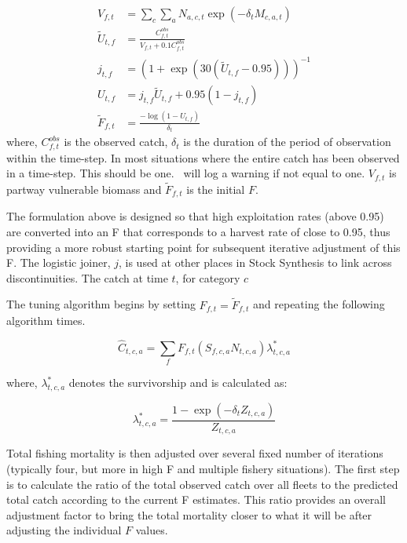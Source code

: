 \begin{align}
	V_{f,t} &= \sum\limits_c\sum\limits_a N_{a,c,t} \exp\left(-\delta_t M_{c,a,t}\right) \nonumber \\
	\tilde{U}_{t,f} &= \frac{C^{obs}_{f,t}}{V_{f,t} + 0.1 C^{obs}_{f,t}}\\
	j_{t,f} &= \left(1 + \exp \left(30 (\tilde{U}_{t,f} - 0.95) \right)\right)^{-1}\\
	U_{t,f} &= 	j_{t,f} \tilde{U}_{t,f} + 0.95 (1 - j_{t,f} )\\
	\tilde{F}_{f,t} &= \frac{-\log\left(1 - U_{t,f}\right)}{\delta_t}
\end{align}
where, \(C^{obs}_{f,t}\) is the observed catch, \(\delta_t\) is the duration of the period of observation within the time-step. In most situations where the entire catch has been observed in a time-step. This should be one. \CNAME\ will log a warning if not equal to one. \(V_{f,t}\) is partway vulnerable biomass and \(\tilde{F}_{f,t}\) is the initial \(F\).

The formulation above is designed so that high exploitation rates (above 0.95) are converted into an F that corresponds to a harvest rate of close to 0.95, thus providing a more robust starting point for subsequent iterative adjustment of this F. The logistic joiner, \(j\), is used at other places in Stock Synthesis to link across discontinuities. The catch at time \(t\), for category \(c\) 

The tuning algorithm begins by setting \(F_{f,t} = \tilde{F}_{f,t}\) and repeating the following algorithm  times.

\[
\widehat{C}_{t,c,a}  = \sum\limits_f {F}_{f,t}\left(S_{f,c,a} N_{t,c,a}\right) \lambda^*_{t,c,a}
\]

where, \(\lambda^*_{t,c,a}\) denotes the survivorship and is calculated as:

\begin{equation}\label{eq:survival}
\lambda^*_{t,c,a} = \frac{1 - \exp\left(-\delta_t Z_{t,c,a}  \right) }{Z_{t,c,a}}
\end{equation}

Total fishing mortality is then adjusted over several fixed number of iterations (typically four, but more in high F and multiple fishery situations). The first step is to calculate the ratio of the total observed catch over all fleets to the predicted total catch according to the current F estimates. This ratio provides an overall adjustment factor to bring the total mortality closer to what it will be after adjusting the individual \(F\) values.

